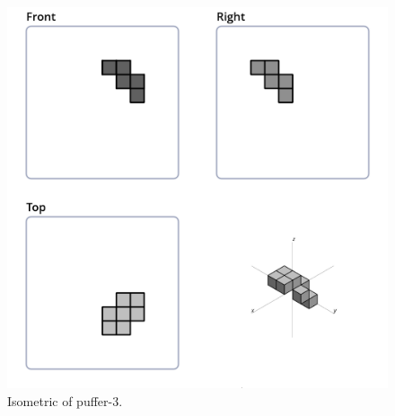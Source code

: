 \begin{figure}[H]
	\centering
	\includegraphics[scale=0.532]{iso_settings/puffer_3.png}
	\caption{Isometric of puffer-3.}
  \label{fig:iso-puffer-3}
\end{figure}
